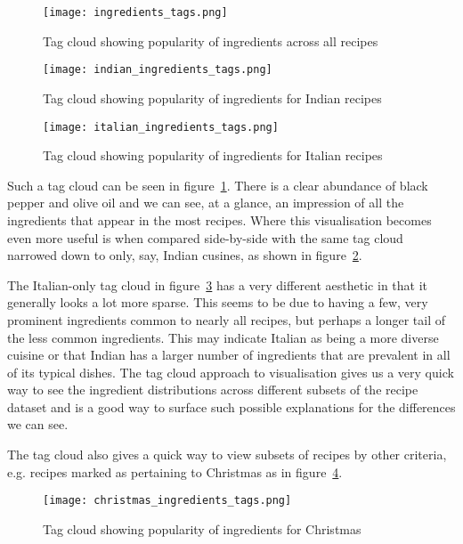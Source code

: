 \documentclass[11pt,a4paper]{article}
\begin{document}
\begin{figure}[b!]
  \texttt{[image: ingredients\_tags.png]}
  \caption{Tag cloud showing popularity of ingredients across all recipes}
  \label{fig:tagcloud}
\end{figure}

\begin{figure}[p]
  \texttt{[image: indian\_ingredients\_tags.png]}
  \caption{Tag cloud showing popularity of ingredients for Indian recipes}
  \label{fig:tagcloud-indian}
\end{figure}

\begin{figure}[p]
  \texttt{[image: italian\_ingredients\_tags.png]}
  \caption{Tag cloud showing popularity of ingredients for Italian recipes}
  \label{fig:tagcloud-italian}
\end{figure}

Such a tag cloud can be seen in figure~\ref{fig:tagcloud}. There is a clear
abundance of black pepper and olive oil and we can see, at a glance, an
impression of all the ingredients that appear in the most recipes. Where
this visualisation becomes even more useful is when compared side-by-side
with the same tag cloud narrowed down to only, say, Indian cusines, as
shown in figure~\ref{fig:tagcloud-indian}.

The Italian-only tag cloud in figure~\ref{fig:tagcloud-italian} has
a very different aesthetic in that it generally looks a lot more sparse. This
seems to be due to having a few, very prominent ingredients common
to nearly all recipes, but perhaps a longer tail of the less common
ingredients. This may indicate Italian as being a more diverse cuisine or
that Indian has a larger number of ingredients that are prevalent in all
of its typical dishes. The tag cloud approach to visualisation gives us
a very quick way to see the ingredient distributions across different
subsets of the recipe dataset and is a good way to surface such possible
explanations for the differences we can see.

The tag cloud also gives a quick way to view subsets of recipes by other
criteria, e.g. recipes marked as pertaining
to Christmas as in figure~\ref{fig:tagcloud-christmas}.

\begin{figure}[h]
  \texttt{[image: christmas\_ingredients\_tags.png]}
  \caption{Tag cloud showing popularity of ingredients for Christmas}
  \label{fig:tagcloud-christmas}
\end{figure}
\end{document}

